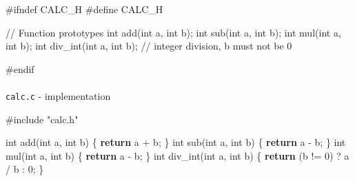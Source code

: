\documentclass[
  letterpaper,
  DIV=11,
  numbers=noendperiod]{scrreprt}
\makeatletter
\let\oldparagraph\paragraph
\renewcommand{\paragraph}{
    \@ifstar
      \xxxParagraphStar
      \xxxParagraphNoStar
  }
\newcommand{\xxxParagraphStar}[1]{\oldparagraph*{#1}\mbox{}}
\newcommand{\xxxParagraphNoStar}[1]{\oldparagraph{#1}\mbox{}}
\newenvironment{Shaded}{\begin{snugshade}}{\end{snugshade}}
\newcommand{\CommentTok}[1]{\textcolor[rgb]{0.37,0.37,0.37}{#1}}
\newcommand{\ControlFlowTok}[1]{\textcolor[rgb]{0.00,0.23,0.31}{\textbf{#1}}}
\newcommand{\DataTypeTok}[1]{\textcolor[rgb]{0.68,0.00,0.00}{#1}}
\newcommand{\DecValTok}[1]{\textcolor[rgb]{0.68,0.00,0.00}{#1}}
\newcommand{\ImportTok}[1]{\textcolor[rgb]{0.00,0.46,0.62}{#1}}
\newcommand{\NormalTok}[1]{\textcolor[rgb]{0.00,0.23,0.31}{#1}}
\newcommand{\OperatorTok}[1]{\textcolor[rgb]{0.37,0.37,0.37}{#1}}
\newcommand{\PreprocessorTok}[1]{\textcolor[rgb]{0.68,0.00,0.00}{#1}}
\makeatother
\begin{document}
\begin{Shaded}
\begin{Highlighting}[]
\PreprocessorTok{\#ifndef CALC\_H}
\PreprocessorTok{\#define CALC\_H}

\CommentTok{// Function prototypes}
\DataTypeTok{int}\NormalTok{ add}\OperatorTok{(}\DataTypeTok{int}\NormalTok{ a}\OperatorTok{,} \DataTypeTok{int}\NormalTok{ b}\OperatorTok{);}
\DataTypeTok{int}\NormalTok{ sub}\OperatorTok{(}\DataTypeTok{int}\NormalTok{ a}\OperatorTok{,} \DataTypeTok{int}\NormalTok{ b}\OperatorTok{);}
\DataTypeTok{int}\NormalTok{ mul}\OperatorTok{(}\DataTypeTok{int}\NormalTok{ a}\OperatorTok{,} \DataTypeTok{int}\NormalTok{ b}\OperatorTok{);}
\DataTypeTok{int}\NormalTok{ div\_int}\OperatorTok{(}\DataTypeTok{int}\NormalTok{ a}\OperatorTok{,} \DataTypeTok{int}\NormalTok{ b}\OperatorTok{);} \CommentTok{// integer division, b must not be 0}

\PreprocessorTok{\#endif}
\end{Highlighting}
\end{Shaded}

\paragraph{\texorpdfstring{\texttt{calc.c} -
implementation}{calc.c - implementation}}\label{calc.c---implementation}

\begin{Shaded}
\begin{Highlighting}[]
\PreprocessorTok{\#include }\ImportTok{"calc.h"}

\DataTypeTok{int}\NormalTok{ add}\OperatorTok{(}\DataTypeTok{int}\NormalTok{ a}\OperatorTok{,} \DataTypeTok{int}\NormalTok{ b}\OperatorTok{)} \OperatorTok{\{} \ControlFlowTok{return}\NormalTok{ a }\OperatorTok{+}\NormalTok{ b}\OperatorTok{;} \OperatorTok{\}}
\DataTypeTok{int}\NormalTok{ sub}\OperatorTok{(}\DataTypeTok{int}\NormalTok{ a}\OperatorTok{,} \DataTypeTok{int}\NormalTok{ b}\OperatorTok{)} \OperatorTok{\{} \ControlFlowTok{return}\NormalTok{ a }\OperatorTok{{-}}\NormalTok{ b}\OperatorTok{;} \OperatorTok{\}}
\DataTypeTok{int}\NormalTok{ mul}\OperatorTok{(}\DataTypeTok{int}\NormalTok{ a}\OperatorTok{,} \DataTypeTok{int}\NormalTok{ b}\OperatorTok{)} \OperatorTok{\{} \ControlFlowTok{return}\NormalTok{ a }\OperatorTok{{-}}\NormalTok{ b}\OperatorTok{;} \OperatorTok{\}}
\DataTypeTok{int}\NormalTok{ div\_int}\OperatorTok{(}\DataTypeTok{int}\NormalTok{ a}\OperatorTok{,} \DataTypeTok{int}\NormalTok{ b}\OperatorTok{)} \OperatorTok{\{} \ControlFlowTok{return} \OperatorTok{(}\NormalTok{b }\OperatorTok{!=} \DecValTok{0}\OperatorTok{)} \OperatorTok{?}\NormalTok{ a }\OperatorTok{/}\NormalTok{ b }\OperatorTok{:} \DecValTok{0}\OperatorTok{;} \OperatorTok{\}}
\end{Highlighting}
\end{Shaded}
\end{document}
